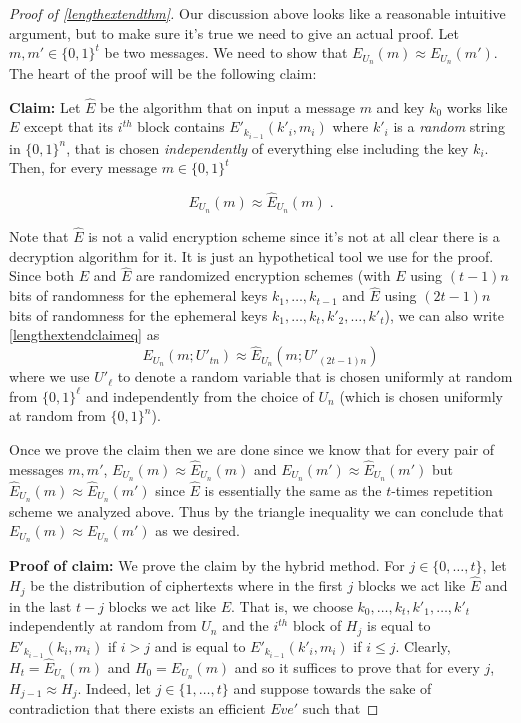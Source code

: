 \begin{proof}[Proof of \cref{lengthextendthm}]
Our discussion above looks like a reasonable intuitive argument, but to
make sure it's true we need to give an actual proof. Let
\(m,m' \in {\{0,1\}}^t\) be two messages. We need to show that
\(E_{U_n}(m) \approx E_{U_n}(m')\). The heart of the proof will be the
following claim:

\textbf{Claim:} Let \(\hat{E}\) be the algorithm that on input a message
\(m\) and key \(k_0\) works like \(E\) except that its \(i^{th}\) block
contains \(E'_{k_{i-1}}(k'_i,m_i)\) where \(k'_i\) is a \emph{random}
string in \({\{0,1\}}^n\), that is chosen \emph{independently} of
everything else including the key \(k_i\). Then, for every message
\(m\in{\{0,1\}}^t\)

\[
E_{U_n}(m) \approx \hat{E}_{U_n}(m)  \label{lengthextendclaimeq} \;.
\]

Note that \(\hat{E}\) is not a valid encryption scheme since it's not at
all clear there is a decryption algorithm for it. It is just an
hypothetical tool we use for the proof. Since both \(E\) and \(\hat{E}\)
are randomized encryption schemes (with \(E\) using \((t-1)n\) bits of
randomness for the ephemeral keys \(k_1,\ldots,k_{t-1}\) and \(\hat{E}\)
using \((2t-1)n\) bits of randomness for the ephemeral keys
\(k_1,\ldots,k_t,k'_2,\ldots,k'_t\)), we can also write
\eqref{lengthextendclaimeq} as
\begin{equation*}
E_{U_n}(m; U'_{tn}) \approx \hat{E}_{U_n}(m; U'_{(2t-1)n})
\end{equation*}
where we use \(U'_\ell\) to denote a random variable that is chosen
uniformly at random from \(\{0,1\}^\ell\) and independently from the
choice of \(U_n\) (which is chosen uniformly at random from
\(\{0,1\}^n\)).

Once we prove the claim then we are done since we know that for every
pair of messages \(m,m'\), \(E_{U_n}(m) \approx \hat{E}_{U_n}(m)\) and
\(E_{U_n}(m') \approx \hat{E}_{U_n}(m')\) but
\(\hat{E}_{U_n}(m) \approx \hat{E}_{U_n}(m')\) since \(\hat{E}\) is
essentially the same as the \(t\)-times repetition scheme we analyzed
above. Thus by the triangle inequality we can conclude that
\(E_{U_n}(m) \approx E_{U_n}(m')\) as we desired.

\textbf{Proof of claim:} We prove the claim by the hybrid method. For
\(j\in \{0,\ldots, t\}\), let \(H_j\) be the distribution of ciphertexts
where in the first \(j\) blocks we act like \(\hat{E}\) and in the last
\(t-j\) blocks we act like \(E\). That is, we choose
\(k_0,\ldots,k_t,k'_1,\ldots,k'_t\) independently at random from \(U_n\)
and the \(i^{th}\) block of \(H_j\) is equal to
\(E'_{k_{i-1}}(k_i,m_i)\) if \(i>j\) and is equal to
\(E'_{k_{i-1}}(k'_i,m_i)\) if \(i\leq j\). Clearly,
\(H_t = \hat{E}_{U_n}(m)\) and \(H_0 = E_{U_n}(m)\) and so it suffices
to prove that for every \(j\), \(H_{j-1} \approx H_j\). Indeed, let
\(j \in \{1,\ldots,t\}\) and suppose towards the sake of contradiction
that there exists an efficient \(Eve'\) such that


\end{proof}
